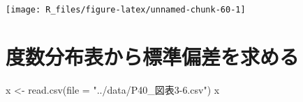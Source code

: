 \documentclass[
  12pt,
]{book}
\newenvironment{Shaded}{\begin{snugshade}}{\end{snugshade}}
\newcommand{\AttributeTok}[1]{\textcolor[rgb]{0.77,0.63,0.00}{#1}}
\newcommand{\CommentTok}[1]{\textcolor[rgb]{0.56,0.35,0.01}{\textit{#1}}}
\newcommand{\DecValTok}[1]{\textcolor[rgb]{0.00,0.00,0.81}{#1}}
\newcommand{\FloatTok}[1]{\textcolor[rgb]{0.00,0.00,0.81}{#1}}
\newcommand{\FunctionTok}[1]{\textcolor[rgb]{0.00,0.00,0.00}{#1}}
\newcommand{\NormalTok}[1]{#1}
\newcommand{\OtherTok}[1]{\textcolor[rgb]{0.56,0.35,0.01}{#1}}
\newcommand{\SpecialCharTok}[1]{\textcolor[rgb]{0.00,0.00,0.00}{#1}}
\newcommand{\StringTok}[1]{\textcolor[rgb]{0.31,0.60,0.02}{#1}}
\begin{document}
\begin{Shaded}
\end{Shaded}

\begin{center}\texttt{[image: R\_files/figure-latex/unnamed-chunk-60-1]} \end{center}

\hypertarget{ux5ea6ux6570ux5206ux5e03ux8868ux304bux3089ux6a19ux6e96ux504fux5deeux3092ux6c42ux3081ux308b}{%
\section{度数分布表から標準偏差を求める}\label{ux5ea6ux6570ux5206ux5e03ux8868ux304bux3089ux6a19ux6e96ux504fux5deeux3092ux6c42ux3081ux308b}}

\begin{Shaded}
\begin{Highlighting}[]
\NormalTok{x }\OtherTok{\textless{}{-}} \FunctionTok{read.csv}\NormalTok{(}\AttributeTok{file =} \StringTok{"../data/P40\_図表3{-}6.csv"}\NormalTok{)}
\NormalTok{x}
\end{Highlighting}
\end{Shaded}
\end{document}
